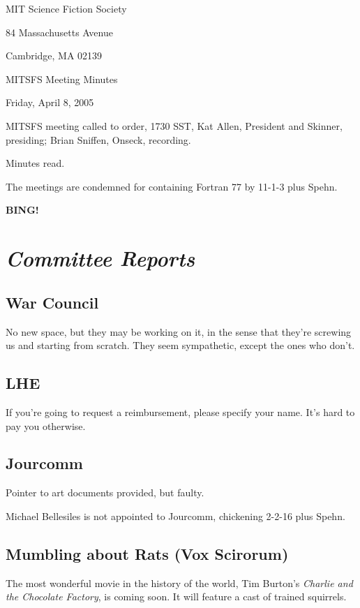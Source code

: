\documentclass[10pt]{article}
\newcommand{\bing}{{\bf BING!} }
\newcommand{\goto}[1]{\bing \vskip 12pt \section*{{\em{#1}}}}
\newcommand{\ps}{ plus Spehn\xspace}
\begin{document}
\begin{center}

MIT Science Fiction Society

84 Massachusetts Avenue

Cambridge, MA 02139

\vspace{12pt}

MITSFS Meeting Minutes

Friday, April 8, 2005

\end{center}

\vspace{18pt}

\setlength{\parskip}{6pt}

\noindent
MITSFS meeting called to order, 1730 SST, Kat Allen, President and
Skinner, presiding; Brian Sniffen,  Onseck, recording.

Minutes read.

The meetings are condemned for containing Fortran 77 by 11-1-3\ps.

\goto{Committee Reports}
\subsection*{War Council}
No new space, but they may be working on it, in the sense that they're
screwing us and starting from scratch.  They seem sympathetic,
except the ones who don't.

\subsection*{LHE}
If you're going to request a reimbursement, please specify your name.
It's hard to pay you otherwise.

\subsection*{Jourcomm}
Pointer to art documents provided, but faulty.

Michael Bellesiles is not appointed to Jourcomm, chickening 2-2-16\ps.

\subsection*{Mumbling about Rats (Vox Scirorum)}
The most wonderful movie in the history of the world, Tim Burton's
\emph{Charlie and the Chocolate Factory}, is coming soon.  It will
feature a cast of trained squirrels.
\end{document}
